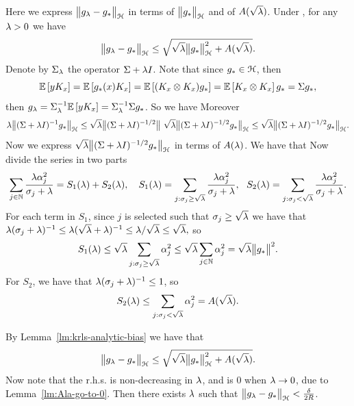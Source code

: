 Here we express $\bigl\|{g_\lambda - g_\ast}\bigr\|_{\mathcal H}$ in terms of $\bigl\|{g_\ast}\bigr\|_\mathcal H$ and of $A(\sqrt{\lambda})$.
\blm\label{lm:krls-analytic-bias}
Under , for any $\lambda > 0$ we have
$$\bigl\|{g_\lambda - g_\ast}\bigr\|_{\mathcal H} \leq \sqrt{\sqrt{\lambda}\bigl\|{g_\ast}\bigr\|_\mathcal H^2 + {A}(\sqrt{\lambda})}.$$
\elm
\bpr
Denote by $\Sigma_\lambda$ the operator $\Sigma + \lambda I$.  Note that since $g_\ast \in \mathcal H$, then 
$$\mathbb{E}\left[{yK_x}\right] = \mathbb{E}\left[{g_\ast(x) K_x}\right] = \mathbb{E}\left[{(K_x \otimes K_x)g_\ast}\right] = \mathbb{E}\left[{K_x \otimes K_x}\right]g_\ast = \Sigma g_\ast,$$
then $g_\lambda = \Sigma_\lambda^{-1}\mathbb{E}\left[{yK_x}\right] = \Sigma_\lambda^{-1}\Sigma g_\ast$. So we have
Moreover
$$
\lambda \bigl\|{(\Sigma + \lambda I)^{-1} g_\ast}\bigr\|_\mathcal H \leq \sqrt{\lambda} \bigl\|{(\Sigma + \lambda I)^{-1/2}}\bigr\|~\sqrt{\lambda} \bigl\|{(\Sigma + \lambda I)^{-1/2} g_\ast}\bigr\|_\mathcal H \leq \sqrt{\lambda} \bigl\|{(\Sigma + \lambda I)^{-1/2} g_\ast}\bigr\|_\mathcal H.$$
Now we express $\sqrt{\lambda}\bigl\|{(\Sigma + \lambda I)^{-1/2} g_\ast}\bigr\|_\mathcal H$ in terms of $A(\lambda)$. We have that
Now divide the series in two parts
$$\sum_{j\in \mathbb N} \frac{\lambda \alpha_j^2}{\sigma_j + \lambda} = S_1(\lambda) + S_2(\lambda), \quad S_1(\lambda) = \sum_{j: \sigma_j \geq \sqrt{\lambda}} \frac{\lambda \alpha_j^2}{\sigma_j + \lambda}, ~~ S_2(\lambda) = \sum_{j: \sigma_j < \sqrt{\lambda}} \frac{\lambda \alpha_j^2}{\sigma_j + \lambda}.$$
For each term in $S_1$, since $j$ is selected such that $\sigma_j \geq \sqrt{\lambda}$ we have that 
$\lambda(\sigma_j + \lambda)^{-1} \leq \lambda(\sqrt{\lambda} + \lambda)^{-1} \leq \lambda/\sqrt{\lambda} \leq \sqrt{\lambda},$
so
$$S_1(\lambda) \leq \sqrt{\lambda} \sum_{j: \sigma_j \geq \sqrt{\lambda}} \alpha_j^2 \leq \sqrt{\lambda} \sum_{j \in \mathbb N} \alpha_j^2 = \sqrt{\lambda} \bigl\|{g_\ast}\bigr\|^2.$$
For $S_2$, we have that $\lambda(\sigma_j + \lambda)^{-1} \leq 1$, so
$$S_2(\lambda) \leq \sum_{j: \sigma_j < \sqrt{\lambda}}  \alpha_j^2 = A(\sqrt{\lambda}).$$
\epr


By Lemma~\ref{lm:krls-analytic-bias} we have that 
$$\bigl\|{g_\lambda - g_\ast}\bigr\|_{\mathcal H} \leq \sqrt{\sqrt{\lambda}\bigl\|{g_\ast}\bigr\|_\mathcal H^2 + {A}(\sqrt{\lambda})}.$$
Now note that the r.h.s. is non-decreasing in $\lambda$, and is $0$ when $\lambda \to 0$, due to Lemma~\ref{lm:Ala-go-to-0}. Then there exists $\lambda$ such that $\bigl\|{g_\lambda - g_\ast}\bigr\|_{\mathcal H} < \frac{\delta}{2R}$.

